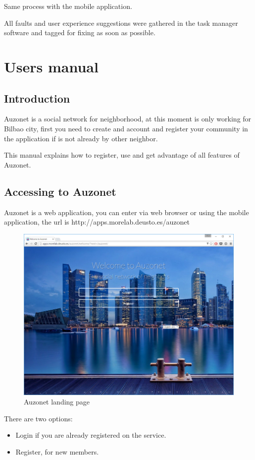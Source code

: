 \documentclass{DeustoFDP}
\begin{document}
Same process with the mobile application.

All faults and user experience suggestions were gathered in the task manager software and tagged for fixing as soon as possible.

\chapter{Users manual}\label{usersmanual}
\section{Introduction}
Auzonet is a social network for neighborhood, at this moment is only working for Bilbao city, first you need to create and account and register your community in the application if is not already by other neighbor.

This manual explains how to register, use and get advantage of all features of Auzonet.
\section{Accessing to Auzonet}
Auzonet is a web application, you can enter via web browser or using the mobile application, the url is http://apps.morelab.deusto.es/auzonet 
\begin{figure}[h!]
\centering
\includegraphics[width=0.9\linewidth]{"fig/Manual/landing"}
\caption[Auzonet landing page]{Auzonet landing page}
\label{fig:landing}
\end{figure}

There are two options:
\begin{itemize}
	\item Login if you are already registered on the service.
	\item Register, for new members.
\end{itemize}
\end{document}
